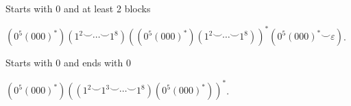 \documentclass[class=math239,notes]{agony}
\begin{document}
\begin{example}
  Starts with 0 and at least 2 blocks
\end{example}
\begin{sol}
  $(0^5(000)^*)(1^2 \smile \dotsb \smile 1^8)((0^5(000)^*)(1^2 \smile \dotsb \smile 1^8))^*(0^5(000)^* \smile \varepsilon)$.
\end{sol}

\begin{example}
  Starts with 0 and ends with 0
\end{example}
\begin{sol}
  $(0^5(000)^*)((1^2 \smile 1^3 \smile \dotsb \smile 1^8)(0^5(000)^*))^*$.
\end{sol}
\end{document}
